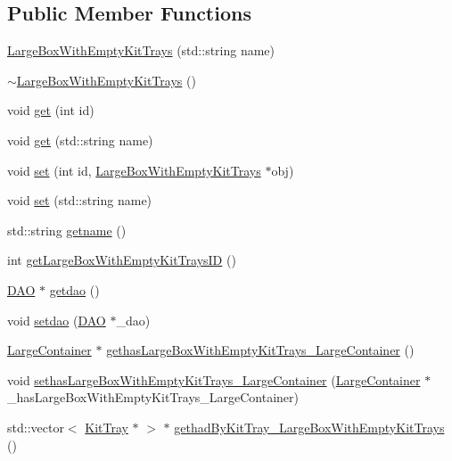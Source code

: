 \subsection*{Public Member Functions}
\begin{DoxyCompactItemize}
\item 
\hyperlink{class_large_box_with_empty_kit_trays_a20c3e6e0be5d322a82cf8c7031294f3e}{LargeBoxWithEmptyKitTrays} (std::string name)
\item 
\hyperlink{class_large_box_with_empty_kit_trays_a405cb72ab73bf31bb7a2116fa96bb894}{$\sim$LargeBoxWithEmptyKitTrays} ()
\item 
void \hyperlink{class_large_box_with_empty_kit_trays_ae59c36a1845d95c4ca6f7effd4e28d8d}{get} (int id)
\item 
void \hyperlink{class_large_box_with_empty_kit_trays_a453605c27e575c642c58f1650e4331d3}{get} (std::string name)
\item 
void \hyperlink{class_large_box_with_empty_kit_trays_a1eb569820f0e8f2f922406ba871d39a0}{set} (int id, \hyperlink{class_large_box_with_empty_kit_trays}{LargeBoxWithEmptyKitTrays} $\ast$obj)
\item 
void \hyperlink{class_large_box_with_empty_kit_trays_a3b9c904cfbf2790818b647534eb26f67}{set} (std::string name)
\item 
std::string \hyperlink{class_large_box_with_empty_kit_trays_ae18c3b0611313032a1a2e18e90639365}{getname} ()
\item 
int \hyperlink{class_large_box_with_empty_kit_trays_a0f7f6028773d7275925ef61e837802bd}{getLargeBoxWithEmptyKitTraysID} ()
\item 
\hyperlink{class_d_a_o}{DAO} $\ast$ \hyperlink{class_large_box_with_empty_kit_trays_ade04e042b1a6d2f347e89b5853715ec6}{getdao} ()
\item 
void \hyperlink{class_large_box_with_empty_kit_trays_a2b4af49556204510a9fc883165dfc742}{setdao} (\hyperlink{class_d_a_o}{DAO} $\ast$\_\-dao)
\item 
\hyperlink{class_large_container}{LargeContainer} $\ast$ \hyperlink{class_large_box_with_empty_kit_trays_a6c335004bb5a70d2917a7053b031afc2}{gethasLargeBoxWithEmptyKitTrays\_\-LargeContainer} ()
\item 
void \hyperlink{class_large_box_with_empty_kit_trays_a4648740fa1a5409e883f5560aaf5d230}{sethasLargeBoxWithEmptyKitTrays\_\-LargeContainer} (\hyperlink{class_large_container}{LargeContainer} $\ast$\_\-hasLargeBoxWithEmptyKitTrays\_\-LargeContainer)
\item 
std::vector$<$ \hyperlink{class_kit_tray}{KitTray} $\ast$ $>$ $\ast$ \hyperlink{class_large_box_with_empty_kit_trays_a5f5fd60278e10cd7d4a700e2dcaf21b8}{gethadByKitTray\_\-LargeBoxWithEmptyKitTrays} ()

\end{DoxyCompactItemize}

